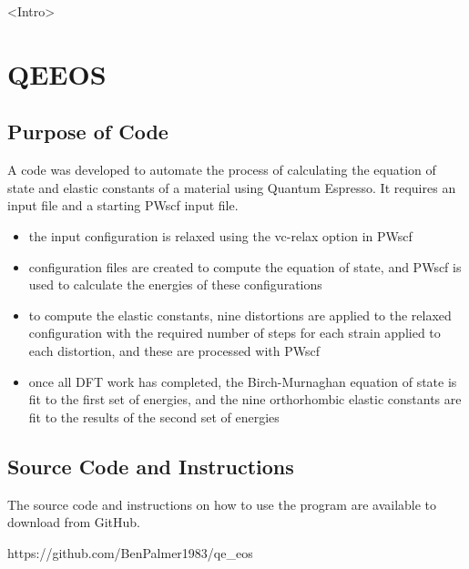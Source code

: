 <Intro>





\section{QEEOS}

\subsection{Purpose of Code}

A code was developed to automate the process of calculating the equation of state and elastic constants of a material using Quantum Espresso.  It requires an input file and a starting PWscf input file.  

\begin{itemize}
\item the input configuration is relaxed using the vc-relax option in PWscf
\item configuration files are created to compute the equation of state, and PWscf is used to calculate the energies of these configurations
\item to compute the elastic constants, nine distortions are applied to the relaxed configuration with the required number of steps for each strain applied to each distortion, and these are processed with PWscf
\item once all DFT work has completed, the Birch-Murnaghan equation of state is fit to the first set of energies, and the nine orthorhombic elastic constants are fit to the results of the second set of energies
\end{itemize}


\subsection{Source Code and Instructions}

The source code and instructions on how to use the program are available to download from GitHub.

https://github.com/BenPalmer1983/qe\_eos








